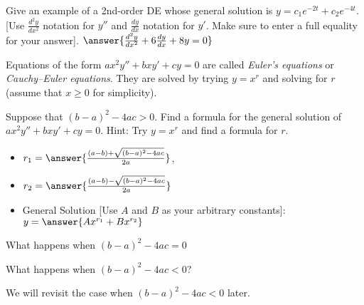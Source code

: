 \documentclass{ximera}
\begin{document}
\begin{exercise}
    Give an example of a 2nd-order DE whose general solution is $y=c_1e^{-2t}+c_2e^{-4t}$. [Use $\frac{d^2y}{dx^2}$ notation for $y''$ and $\frac{dy}{dx}$ notation for $y'$. Make sure to enter a full equality for your answer]. $\answer{\frac{d^2y}{dx^2} + 6\frac{dy}{dx} + 8y = 0}$
\end{exercise}


Equations of the form $a x^2 y'' + b x y' + c y = 0$ are called \emph{Euler's equations} or \emph{Cauchy--Euler equations}. They are solved by trying $y=x^r$ and solving for $r$ (assume that $x \geq 0$ for simplicity).

\begin{exercise} \label{sol:eulerex}
    Suppose that ${(b-a)}^2-4ac > 0$.
    Find a formula for the general solution of $a x^2 y'' + b x y' + c y = 0$.  Hint: Try $y=x^r$ and find a formula for $r$. 
    \begin{itemize}
        \item $r_1 = \answer{\frac{(a-b) + \sqrt{(b-a)^2 - 4ac}}{2a}}$,
        \item $r_2 = \answer{\frac{(a-b) - \sqrt{(b-a)^2 - 4ac}}{2a}}$
        \item General Solution [Use $A$ and $B$ as your arbitrary constants]: $y = \answer{Ax^{r_1} + Bx^{r_2}}$
    \end{itemize}
    \begin{problem}
        What happens when ${(b-a)}^2-4ac = 0$ 
        \begin{multipleChoice}
        \end{multipleChoice}
        \begin{problem}
            What happens when ${(b-a)}^2-4ac < 0$?
            \begin{multipleChoice}
            \end{multipleChoice}
            \begin{feedback}[correct]
                We will revisit the case when ${(b-a)}^2-4ac < 0$ later.
            \end{feedback}
        \end{problem}
    \end{problem}
\end{exercise}
\end{document}
